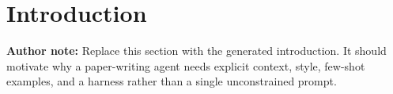 \section{Introduction}

\textbf{Author note:} Replace this section with the generated introduction. It should motivate why a paper-writing agent needs explicit context, style, few-shot examples, and a harness rather than a single unconstrained prompt.
